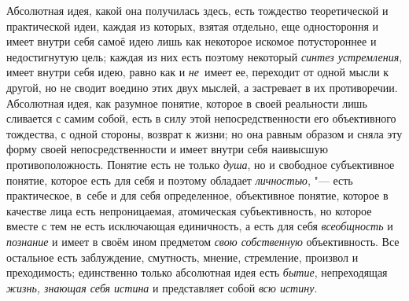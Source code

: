 Абсолютная идея, какой она получилась здесь, есть тождество
теоретической и практической идеи, каждая из которых, взятая отдельно, еще
одностороння и имеет внутри себя самоё идею лишь как некоторое искомое
потустороннее и недостигнутую цель; каждая из них есть поэтому некоторый
{\em синтез устремления},
имеет внутри себя идею, равно как и
{\em не}~имеет ее,
переходит от одной мысли к другой, но не сводит воедино этих двух мыслей, а
застревает в их противоречии. Абсолютная идея, как разумное понятие,
которое в своей реальности лишь сливается с самим собой, есть в силу этой
непосредственности его объективного тождества, с одной стороны, возврат к
жизни; но она равным образом и сняла эту форму своей непосредственности и
имеет внутри себя наивысшую противоположность. Понятие есть не только
{\em душа}, но и
свободное субъективное понятие, которое есть для себя и поэтому обладает
{\em личностью}, "--- есть
практическое, в~себе и для себя определенное, объективное понятие, которое
в качестве лица есть непроницаемая, атомическая субъективность, но которое
вместе с тем не есть исключающая единичность, а есть для себя
{\em всеобщность} и
{\em познание} и имеет в
своём ином предметом {\em свою
собственную} объективность. Все остальное есть заблуждение,
смутность, мнение, стремление, произвол и преходимость; единственно только
абсолютная идея есть {\em бытие},
непреходящая {\em жизнь,
знающая себя истина} и представляет собой
{\em всю истину}.

